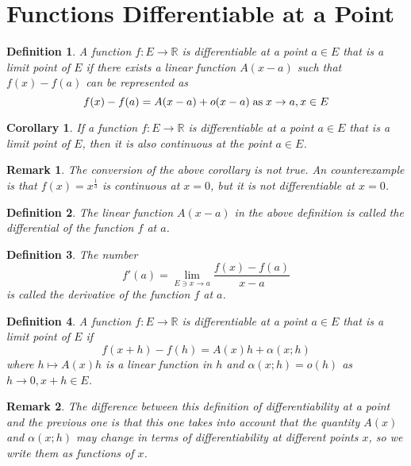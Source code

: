 \documentclass[onecolumn]{ctexart}
\newtheorem{definition}{Definition}
\newtheorem{corollary}{Corollary}
\newtheorem{remark}{Remark}
\begin{document}
\section{Functions Differentiable at a Point}

\begin{definition}
  A function $f:E \to \mathbb{R}$ is differentiable at a point $a \in E$ that is 
  a limit point of $E$ if there exists a linear function $A(x - a)$ such that 
  $f(x) - f(a)$ can be represented as
  \begin{equation}
    f(x) - f(a) = A (x - a) + o(x - a) \thickspace \textnormal{as} \thickspace x \to a, x \in E
  \end{equation}
\end{definition}
\begin{corollary}
  If a function $f:E \to \mathbb{R}$ is differentiable at a point $a \in E$ that 
  is a limit point of $E$, then it is also continuous at the point $a \in E$.
\end{corollary}
\begin{remark}
  The conversion of the above corollary is not true. An counterexample is that 
  $f(x) = x^{\frac{1}{3}}$ is continuous at $x = 0$, but it is not 
  differentiable at $x = 0$.
\end{remark}

\begin{definition}
  The linear function $A (x - a)$ in the above definition is called the 
  differential of the function $f$ at $a$.
\end{definition}

\begin{definition}
  The number
  \begin{equation}
    f'(a) = \lim_{E \owns x \to a} \frac{f(x) - f(a)}{x - a}
  \end{equation}
  is called the derivative of the function $f$ at $a$.
\end{definition}

\begin{definition}
  A function $f:E \to \mathbb{R}$ is differentiable at a point $a \in E$ that is 
  a limit point of $E$ if
  \begin{equation}
    f(x + h) - f(h) = A(x)h + \alpha(x;h)
  \end{equation}
  where $h \mapsto A(x)h$ is a linear function in $h$ and $\alpha(x;h) = o(h)$ 
  as $h \to 0, x + h \in E$.
\end{definition}
\begin{remark}
  The difference between this definition of differentiability at a point and the 
  previous one is that this one takes into account that the quantity $A(x)$ and 
  $\alpha(x;h)$ may change in terms of differentiability at different points $x$, 
  so we write them as functions of $x$.
\end{remark}
\end{document}
